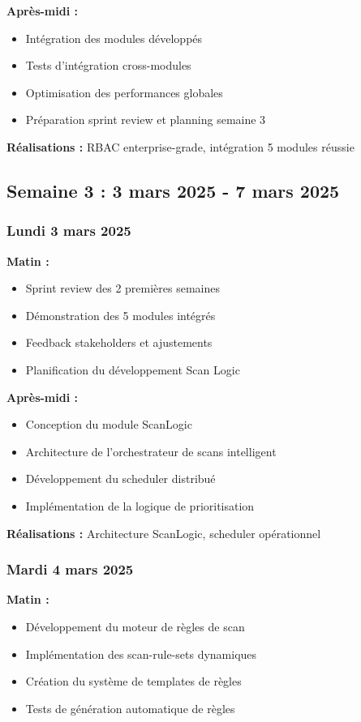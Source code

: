 \documentclass[a4paper,12pt]{article}
\begin{document}
\textbf{Après-midi :}
\begin{itemize}
    \item Intégration des modules développés
    \item Tests d'intégration cross-modules
    \item Optimisation des performances globales
    \item Préparation sprint review et planning semaine 3
\end{itemize}

\textbf{Réalisations :} RBAC enterprise-grade, intégration 5 modules réussie

\subsection*{Semaine 3 : 3 mars 2025 - 7 mars 2025}

\subsubsection*{Lundi 3 mars 2025}
\textbf{Matin :}
\begin{itemize}
    \item Sprint review des 2 premières semaines
    \item Démonstration des 5 modules intégrés
    \item Feedback stakeholders et ajustements
    \item Planification du développement Scan Logic
\end{itemize}

\textbf{Après-midi :}
\begin{itemize}
    \item Conception du module ScanLogic
    \item Architecture de l'orchestrateur de scans intelligent
    \item Développement du scheduler distribué
    \item Implémentation de la logique de prioritisation
\end{itemize}

\textbf{Réalisations :} Architecture ScanLogic, scheduler opérationnel

\subsubsection*{Mardi 4 mars 2025}
\textbf{Matin :}
\begin{itemize}
    \item Développement du moteur de règles de scan
    \item Implémentation des scan-rule-sets dynamiques
    \item Création du système de templates de règles
    \item Tests de génération automatique de règles
\end{itemize}
\end{document}
